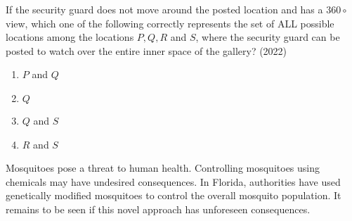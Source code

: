 If the security guard does not move around the posted location and has a $360 \circ$ view, which one of the following correctly represents the set of ALL possible locations among the locations $P, Q, R$ and $S$, where the security guard can be posted to watch over the entire inner space of the gallery?
\hfill{(2022)}
          \begin{enumerate}
        \item $P$ and $Q$
        \item $Q$
        \item $Q$ and $S$
        \item $R$ and $S$
    \end{enumerate}
	\item  Mosquitoes pose a threat to human health. Controlling mosquitoes using chemicals may have undesired consequences. In Florida, authorities have used genetically modified mosquitoes to control the overall mosquito population. It remains to be seen if this novel approach has unforeseen consequences.

